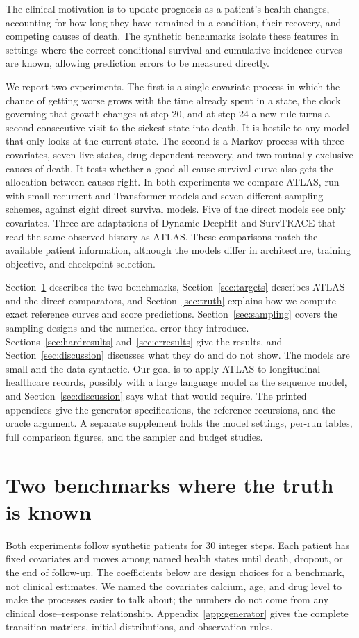 The clinical motivation is to update prognosis as a patient's health changes, accounting for how long they have remained in a condition, their recovery, and competing causes of death. The synthetic benchmarks isolate these features in settings where the correct conditional survival and cumulative incidence curves are known, allowing prediction errors to be measured directly.

We report two experiments. The first is a single-covariate process in which the chance of getting worse grows with the time already spent in a state, the clock governing that growth changes at step 20, and at step 24 a new rule turns a second consecutive visit to the sickest state into death. It is hostile to any model that only looks at the current state. The second is a Markov process with three covariates, seven live states, drug-dependent recovery, and two mutually exclusive causes of death. It tests whether a good all-cause survival curve also gets the allocation between causes right. In both experiments we compare ATLAS, run with small recurrent and Transformer models and seven different sampling schemes, against eight direct survival models. Five of the direct models see only covariates. Three are adaptations of Dynamic-DeepHit and SurvTRACE that read the same observed history as ATLAS. These comparisons match the available patient information, although the models differ in architecture, training objective, and checkpoint selection.

Section~\ref{sec:benchmark} describes the two benchmarks, Section~\ref{sec:targets} describes ATLAS and the direct comparators, and Section~\ref{sec:truth} explains how we compute exact reference curves and score predictions. Section~\ref{sec:sampling} covers the sampling designs and the numerical error they introduce. Sections~\ref{sec:hardresults} and~\ref{sec:crresults} give the results, and Section~\ref{sec:discussion} discusses what they do and do not show. The models are small and the data synthetic. Our goal is to apply ATLAS to longitudinal healthcare records, possibly with a large language model as the sequence model, and Section~\ref{sec:discussion} says what that would require. The printed appendices give the generator specifications, the reference recursions, and the oracle argument. A separate supplement holds the model settings, per-run tables, full comparison figures, and the sampler and budget studies.

\section{Two benchmarks where the truth is known}\label{sec:benchmark}
Both experiments follow synthetic patients for 30 integer steps. Each patient has fixed covariates and moves among named health states until death, dropout, or the end of follow-up. The coefficients below are design choices for a benchmark, not clinical estimates. We named the covariates calcium, age, and drug level to make the processes easier to talk about; the numbers do not come from any clinical dose--response relationship. Appendix~\ref{app:generator} gives the complete transition matrices, initial distributions, and observation rules.


